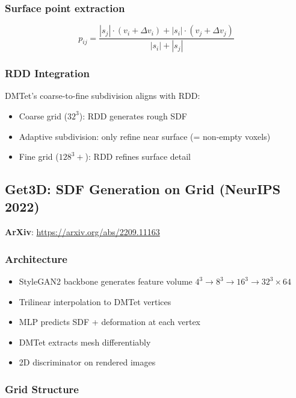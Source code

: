 \documentclass[11pt, a4paper]{article}
\begin{document}
\subsubsection{Surface point extraction}

\begin{equation}
    p_{ij} = \frac{|s_j| \cdot (v_i + \Delta v_i) + |s_i| \cdot (v_j + \Delta v_j)}{|s_i| + |s_j|}
\end{equation}

\subsubsection{RDD Integration}

DMTet's coarse-to-fine subdivision aligns with RDD:
\begin{itemize}
    \item Coarse grid ($32^3$): RDD generates rough SDF
    \item Adaptive subdivision: only refine near surface (= non-empty voxels)
    \item Fine grid ($128^3+$): RDD refines surface detail
\end{itemize}

\subsection{Get3D: SDF Generation on Grid (NeurIPS 2022)}

\textbf{ArXiv}: \url{https://arxiv.org/abs/2209.11163}

\subsubsection{Architecture}

\begin{itemize}
    \item StyleGAN2 backbone generates feature volume $4^3 \to 8^3 \to 16^3 \to 32^3 \times 64$
    \item Trilinear interpolation to DMTet vertices
    \item MLP predicts SDF + deformation at each vertex
    \item DMTet extracts mesh differentiably
    \item 2D discriminator on rendered images
\end{itemize}

\subsubsection{Grid Structure}
\end{document}

